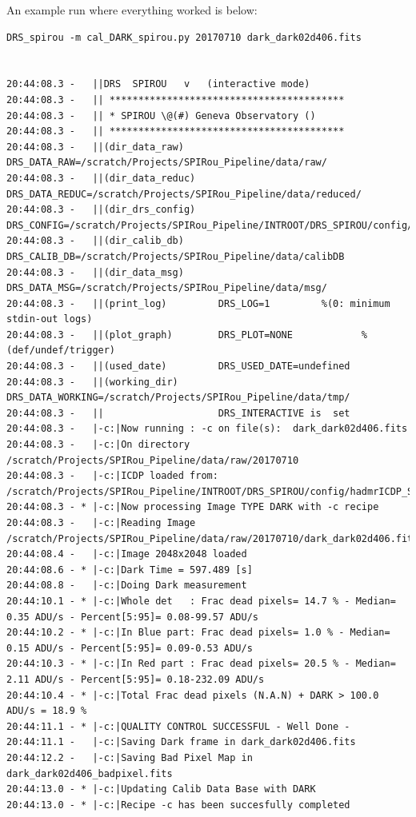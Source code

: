 An example run where everything worked is below:

\begin{lstlisting}[style=text]
DRS_spirou -m cal_DARK_spirou.py 20170710 dark_dark02d406.fits


20:44:08.3 -   ||DRS  SPIROU   v   (interactive mode)
20:44:08.3 -   || *****************************************
20:44:08.3 -   || * SPIROU \@(#) Geneva Observatory ()
20:44:08.3 -   || *****************************************
20:44:08.3 -   ||(dir_data_raw)      DRS_DATA_RAW=/scratch/Projects/SPIRou_Pipeline/data/raw/
20:44:08.3 -   ||(dir_data_reduc)    DRS_DATA_REDUC=/scratch/Projects/SPIRou_Pipeline/data/reduced/
20:44:08.3 -   ||(dir_drs_config)    DRS_CONFIG=/scratch/Projects/SPIRou_Pipeline/INTROOT/DRS_SPIROU/config/
20:44:08.3 -   ||(dir_calib_db)      DRS_CALIB_DB=/scratch/Projects/SPIRou_Pipeline/data/calibDB
20:44:08.3 -   ||(dir_data_msg)      DRS_DATA_MSG=/scratch/Projects/SPIRou_Pipeline/data/msg/
20:44:08.3 -   ||(print_log)         DRS_LOG=1         %(0: minimum stdin-out logs)
20:44:08.3 -   ||(plot_graph)        DRS_PLOT=NONE            %(def/undef/trigger)
20:44:08.3 -   ||(used_date)         DRS_USED_DATE=undefined
20:44:08.3 -   ||(working_dir)       DRS_DATA_WORKING=/scratch/Projects/SPIRou_Pipeline/data/tmp/
20:44:08.3 -   ||                    DRS_INTERACTIVE is  set
20:44:08.3 -   |-c:|Now running : -c on file(s):  dark_dark02d406.fits
20:44:08.3 -   |-c:|On directory /scratch/Projects/SPIRou_Pipeline/data/raw/20170710
20:44:08.3 -   |-c:|ICDP loaded from: /scratch/Projects/SPIRou_Pipeline/INTROOT/DRS_SPIROU/config/hadmrICDP_SPIROU.py
20:44:08.3 - * |-c:|Now processing Image TYPE DARK with -c recipe
20:44:08.3 -   |-c:|Reading Image /scratch/Projects/SPIRou_Pipeline/data/raw/20170710/dark_dark02d406.fits
20:44:08.4 -   |-c:|Image 2048x2048 loaded
20:44:08.6 - * |-c:|Dark Time = 597.489 [s]
20:44:08.8 -   |-c:|Doing Dark measurement
20:44:10.1 - * |-c:|Whole det   : Frac dead pixels= 14.7 % - Median= 0.35 ADU/s - Percent[5:95]= 0.08-99.57 ADU/s
20:44:10.2 - * |-c:|In Blue part: Frac dead pixels= 1.0 % - Median= 0.15 ADU/s - Percent[5:95]= 0.09-0.53 ADU/s
20:44:10.3 - * |-c:|In Red part : Frac dead pixels= 20.5 % - Median= 2.11 ADU/s - Percent[5:95]= 0.18-232.09 ADU/s
20:44:10.4 - * |-c:|Total Frac dead pixels (N.A.N) + DARK > 100.0 ADU/s = 18.9 %
20:44:11.1 - * |-c:|QUALITY CONTROL SUCCESSFUL - Well Done -
20:44:11.1 -   |-c:|Saving Dark frame in dark_dark02d406.fits                                                                                      
20:44:12.2 -   |-c:|Saving Bad Pixel Map in dark_dark02d406_badpixel.fits                                                                            
20:44:13.0 - * |-c:|Updating Calib Data Base with DARK                                                                                                  
20:44:13.0 - * |-c:|Recipe -c has been succesfully completed

\end{lstlisting}

